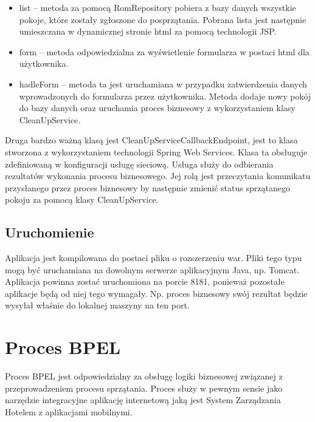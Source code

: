 \begin{itemize}
\item list -- metoda za pomocą RomRepository pobiera z bazy danych wszystkie pokoje, które zostały zgłoszone do posprzątania. Pobrana lista jest  następnie umieszczana w dynamicznej stronie html za pomocą technologii JSP. 
\item form -- metoda odpowiedzialna za wyświetlenie formularza w postaci html dla użytkownika. 
\item hadleForm -- metoda ta jest uruchamiana w przypadku zatwierdzenia danych wprowadzonych do formularza przez użytkownika. Metoda dodaje nowy pokój do bazy danych oraz uruchamia proces biznesowy z wykorzystaniem klasy CleanUpService. 
\end{itemize}

Druga bardzo ważną klasą jest CleanUpServiceCallbackEndpoint, jest to klasa stworzona z wykorzystaniem technologii Spring Web Services. Klasa ta obsługuje zdefiniowaną w konfiguracji usługę sieciową. Usługa służy do odbierania rezultatów wykonania procesu biznesowego. Jej rolą jest przeczytania komunikatu przysłanego przez proces biznesowy by następnie zmienić status sprzątanego pokoju za pomocą klasy CleanUpService. 

\subsection{Uruchomienie}

Aplikacja jest kompilowana do postaci pliku o rozszerzeniu war. Pliki tego typu mogą być uruchamiana na dowolnym serwerze aplikacyjnym Java, np. Tomcat. Aplikacja powinna zostać uruchomiona na porcie 8181, ponieważ pozostałe aplikacje będą od niej tego wymagały. Np. proces biznesowy swój rezultat będzie wysyłał właśnie do lokalnej maszyny na ten port. 


\section{Proces BPEL }
\label{sec:exampleBPEL}

Proces BPEL jest odpowiedzialny za obsługę logiki biznesowej związanej z przeprowadzeniem procesu sprzątania. Proces służy w pewnym sensie jako narzędzie integracyjne aplikację internetową jaką jest System Zarządzania Hotelem z aplikacjami mobilnymi. 

